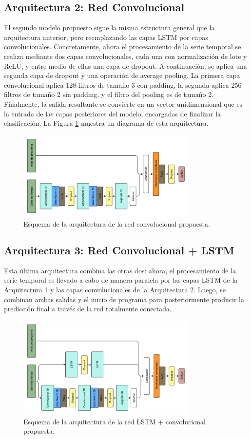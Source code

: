 \documentclass[../../main.tex]{subfiles}
\begin{document}
\subsection{Arquitectura 2: Red Convolucional}
El segundo modelo propuesto sigue la misma estructura general que la arquitectura
anterior, pero reemplazando las capas LSTM por capas convolucionales. Concretamente, ahora
el procesamiento de la serie temporal se realiza mediante dos capas convolucionales, cada
una con normalización de lote y ReLU, y entre medio de ellas una capa de dropout. A
continuación, se aplica una segunda capa de dropout y una operación de average pooling. La
primera capa convolucional aplica 128 filtros de tamaño 3 con padding, la segunda aplica
256 filtros de tamaño 2 sin padding, y el filtro del pooling es de tamaño 2. Finalmente,
la salida resultante se convierte en un vector unidimensional que es la entrada de las
capas posteriores del modelo, encargadas de finalizar la clasificación. La Figura
\ref{fig:conv} muestra un diagrama de esta arquitectura.
\begin{figure}[ht]
    \centering
    \includegraphics[width=0.8\textwidth]{figs/conv.png}
    \caption{Esquema de la arquitectura de la red convolucional propuesta.}
    \label{fig:conv}
\end{figure}

\subsection{Arquitectura 3: Red Convolucional + LSTM}
Esta última arquitectura combina las otras dos: ahora, el procesamiento de la serie
temporal es llevado a cabo de manera paralela por las capas LSTM de la Arquitectura 1
y las capas convolucionales de la Arquitectura 2. Luego, se combinan ambas salidas y
el inicio de programa para posteriormente producir la predicción final a través de la
red totalmente conectada.
\begin{figure}[ht]
    \centering
    \includegraphics[width=0.8\textwidth]{figs/lstm_conv.png}
    \caption{Esquema de la arquitectura de la red LSTM + convolucional propuesta.}
    \label{fig:lstm_v2_conv}
\end{figure}
\end{document}
